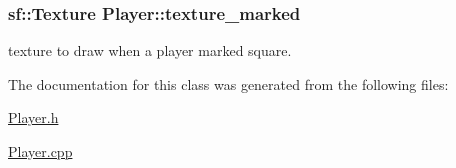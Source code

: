 \subsubsection[{texture\+\_\+marked}]{\setlength{\rightskip}{0pt plus 5cm}sf\+::\+Texture Player\+::texture\+\_\+marked\hspace{0.3cm}{\ttfamily [private]}}\label{class_player_a9e50410dd4405082cc4374126e813a95}


texture to draw when a player marked square. 



The documentation for this class was generated from the following files\+:\begin{DoxyCompactItemize}
\item 
\hyperlink{_player_8h}{Player.\+h}\item 
\hyperlink{_player_8cpp}{Player.\+cpp}\end{DoxyCompactItemize}
